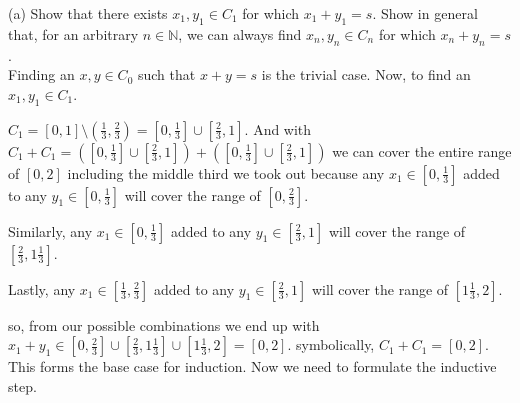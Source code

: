 (a) Show that there exists $x_1, y_1 \in C_1$ for which $x_1 + y_1 = s$.
Show in general that, for an arbitrary $n \in \mathbb{N}$, we can always find $x_n, y_n \in C_n$
for which $x_n + y_n = s$.
\\

Finding an $x,y \in C_0$ such that $x + y = s$ is the trivial case.
Now, to find an $x_1, y_1 \in C_1$.

$C_1 = [0,1] \setminus \left(\frac{1}{3}, \frac{2}{3}\right) = \left[0, \frac{1}{3}\right] \cup \left[\frac{2}{3}, 1\right]$.
And with $C_1 + C_1 = \left( \left[0, \frac{1}{3}\right] \cup \left[\frac{2}{3}, 1\right] \right) + \left( \left[0, \frac{1}{3}\right] \cup \left[\frac{2}{3}, 1\right] \right)$
we can cover the entire range of $[0,2]$ including the middle third we took out because any $x_1 \in \left[0, \frac{1}{3}\right]$
added to any $y_1 \in \left[0, \frac{1}{3}\right]$ will cover the range of $\left[0, \frac{2}{3}\right]$.

Similarly, any $x_1 \in \left[0, \frac{1}{3}\right]$ added to any $y_1 \in \left[\frac{2}{3}, 1\right]$
will cover the range of $\left[\frac{2}{3}, 1\frac{1}{3}\right]$.

Lastly, any $x_1 \in \left[\frac{1}{3}, \frac{2}{3}\right]$ added to any $y_1 \in \left[\frac{2}{3}, 1\right]$
will cover the range of $\left[1\frac{1}{3}, 2\right]$.

so, from our possible combinations we end up with
$x_1 + y_1 \in \left[0, \frac{2}{3}\right] \cup \left[\frac{2}{3}, 1\frac{1}{3}\right] \cup \left[1\frac{1}{3}, 2\right] = [0,2]$.
symbolically, $C_1 + C_1 = [0,2]$.
This forms the base case for induction.
Now we need to formulate the inductive step.
\\

